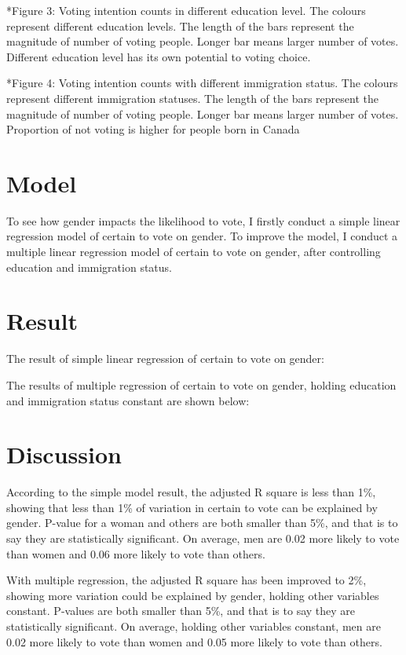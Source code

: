 \documentclass[
]{article}
\begin{document}
*Figure 3: Voting intention counts in different education level. The
colours represent different education levels. The length of the bars
represent the magnitude of number of voting people. Longer bar means
larger number of votes. Different education level has its own potential
to voting choice.

*Figure 4: Voting intention counts with different immigration status.
The colours represent different immigration statuses. The length of the
bars represent the magnitude of number of voting people. Longer bar
means larger number of votes. Proportion of not voting is higher for
people born in Canada

\hypertarget{model}{%
\section{Model}\label{model}}

To see how gender impacts the likelihood to vote, I firstly conduct a
simple linear regression model of certain to vote on gender. To improve
the model, I conduct a multiple linear regression model of certain to
vote on gender, after controlling education and immigration status.

\hypertarget{result}{%
\section{Result}\label{result}}

The result of simple linear regression of certain to vote on gender:

The results of multiple regression of certain to vote on gender, holding
education and immigration status constant are shown below:

\hypertarget{discussion}{%
\section{Discussion}\label{discussion}}

According to the simple model result, the adjusted R square is less than
1\%, showing that less than 1\% of variation in certain to vote can be
explained by gender. P-value for a woman and others are both smaller
than 5\%, and that is to say they are statistically significant. On
average, men are 0.02 more likely to vote than women and 0.06 more
likely to vote than others.

With multiple regression, the adjusted R square has been improved to
2\%, showing more variation could be explained by gender, holding other
variables constant. P-values are both smaller than 5\%, and that is to
say they are statistically significant. On average, holding other
variables constant, men are 0.02 more likely to vote than women and 0.05
more likely to vote than others.
\end{document}
